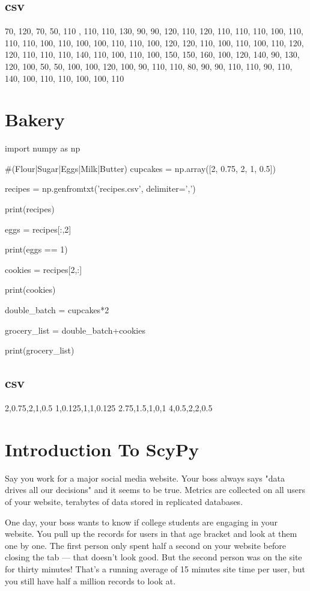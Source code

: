 \documentclass{journal}
\begin{document}
\subsection{csv}
70, 120, 70, 50, 110 , 110, 110, 130, 90, 90, 120, 110, 120, 110, 110, 110, 100, 110, 110, 110, 100, 110, 100, 100, 110, 110, 100, 120, 120, 110, 100, 110, 100, 110, 120, 120, 110, 110, 110, 140, 110, 100, 110, 100, 150, 150, 160, 100, 120, 140, 90, 130, 120, 100, 50, 50, 100, 100, 120, 100, 90, 110, 110, 80, 90, 90, 110, 110, 90, 110, 140, 100, 110, 110, 100, 100, 110

\section{Bakery}
import numpy as np

#(Flour|Sugar|Eggs|Milk|Butter)
cupcakes = np.array([2, 0.75, 2, 1, 0.5])

recipes = np.genfromtxt('recipes.csv', delimiter=',')

print(recipes)

eggs = recipes[:,2]

print(eggs == 1)

cookies = recipes[2,:]

print(cookies)

double_batch = cupcakes*2

grocery_list = double_batch+cookies

print(grocery_list)

\subsection{csv}
2,0.75,2,1,0.5
1,0.125,1,1,0.125
2.75,1.5,1,0,1
4,0.5,2,2,0.5

\section{Introduction To ScyPy}
Say you work for a major social media website. Your boss always says "data drives all our decisions" and it seems to be true. Metrics are collected on all users of your website, terabytes of data stored in replicated databases.

One day, your boss wants to know if college students are engaging in your website. You pull up the records for users in that age bracket and look at them one by one. The first person only spent half a second on your website before closing the tab — that doesn't look good. But the second person was on the site for thirty minutes! That's a running average of 15 minutes site time per user, but you still have half a million records to look at.
\end{document}
